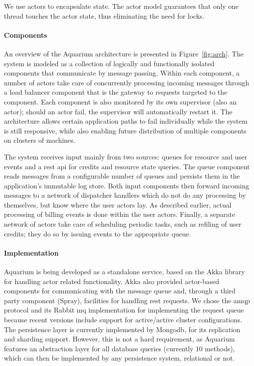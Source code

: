 We use actors to encapsulate state. The actor model guarantees that
only one thread touches the actor state, thus eliminating the need for
locks.

\paragraph{Components} An overview of the Aquarium architecture is
presented in Figure~\ref{fig:arch}. The system is modeled as a
collection of logically and functionally isolated components that
communicate by message passing. Within each component, a number of
actors take care of concurrently processing incoming messages through
a load balancer component that is the gateway to requests targeted to
the component. Each component is also monitored by its own supervisor
(also an actor); should an actor fail, the supervisor will
automatically restart it. The architecture allows certain application
paths to fail individually while the system is still responsive, while
also enabling future distribution of multiple components on clusters
of machines.

The system receives input mainly from two sources: queues for
resource and user events and a {\sc rest api} for credits and resource
state queries. The queue component reads messages from a configurable
number of queues and persists them in the application's immutable log
store. Both input components then forward incoming messages to a
network of dispatcher handlers which do not do any processing by
themselves, but know where the user actors lay. As described earlier,
actual processing of billing events is done within the user actors.
Finally, a separate network of actors take care of scheduling periodic
tasks, such as refiling of user credits; they do so by issuing events
to the appropriate queue.

\paragraph{Implementation}

Aquarium is being developed as a standalone service, based on the Akka
library for handling actor related functionality. Akka also provided
actor-based components for communicating with the message queue and,
through a third party component (Spray), facilities for handling {\sc
  rest} requests. We chose the {\sc amqp} protocol and its Rabbit{\sc
  mq} implementation for implementing the request queue because recent
versions include support for active/active cluster configurations. The
persistence layer is currently implemented by Mongo{\sc db}, for its
replication and sharding support. However, this is not a hard
requirement, as Aquarium features an abstraction layer for all
database queries (currently 10 methods), which can then be implemented
by any persistence system, relational or not.
